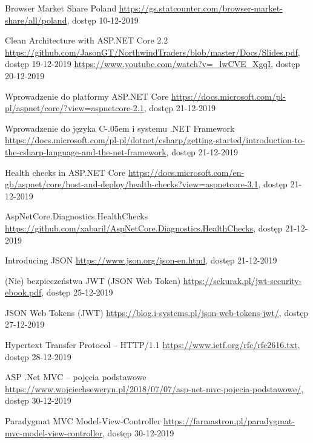 \documentclass[12pt]{article}
\newcommand{\Csharp}{%
  {\settoheight{\dimen0}{C}C\kern-.05em \resizebox{!}{\dimen0}{\raisebox{\depth}{\# }}}}
\numberwithin{figure}{section}
\begin{document}
\begin{sloppypar}
\begin{thebibliography}{99}
    Browser Market Share Poland
    \url{https://gs.statcounter.com/browser-market-share/all/poland}, dostęp 10-12-2019
    
    Clean Architecture with ASP.NET Core 2.2
    \url{https://github.com/JasonGT/NorthwindTraders/blob/master/Docs/Slides.pdf}, dostęp 19-12-2019
    \url{https://www.youtube.com/watch?v=_lwCVE_XgqI}, dostęp 20-12-2019
    
    Wprowadzenie do platformy ASP.NET Core
    \url{https://docs.microsoft.com/pl-pl/aspnet/core/?view=aspnetcore-2.1}, dostęp 21-12-2019
    
    Wprowadzenie do języka \Csharp i systemu .NET Framework
    \url{https://docs.microsoft.com/pl-pl/dotnet/csharp/getting-started/introduction-to-the-csharp-language-and-the-net-framework}, dostęp 21-12-2019
    
    Health checks in ASP.NET Core
    \url{https://docs.microsoft.com/en-gb/aspnet/core/host-and-deploy/health-checks?view=aspnetcore-3.1}, dostęp 21-12-2019
    
    AspNetCore.Diagnostics.HealthChecks
    \url{https://github.com/xabaril/AspNetCore.Diagnostics.HealthChecks}, dostęp 21-12-2019
    
    Introducing JSON
    \url{https://www.json.org/json-en.html}, dostęp 21-12-2019
    
    (Nie) bezpieczeństwa JWT (JSON Web Token)
    \url{https://sekurak.pl/jwt-security-ebook.pdf}, dostęp 25-12-2019
    
    JSON Web Tokens (JWT)
    \url{https://blog.i-systems.pl/json-web-tokens-jwt/}, dostęp 27-12-2019
    
    Hypertext Transfer Protocol -- HTTP/1.1
    \url{https://www.ietf.org/rfc/rfc2616.txt}, dostęp 28-12-2019
    
    ASP .Net MVC – pojęcia podstawowe
    \url{https://www.wojciechseweryn.pl/2018/07/07/asp-net-mvc-pojecia-podstawowe/}, dostęp 30-12-2019
    
    Paradygmat MVC Model-View-Controller
    \url{https://farmastron.pl/paradygmat-mvc-model-view-controller}, dostęp 30-12-2019
    
    \end{thebibliography}
\end{sloppypar}
\end{document}
